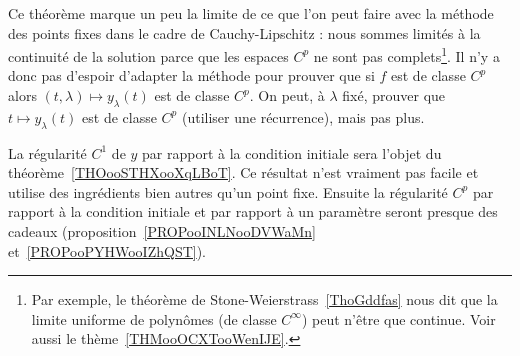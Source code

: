\begin{normaltext}
	Ce théorème marque un peu la limite de ce que l'on peut faire avec la méthode des points fixes dans le cadre de Cauchy-Lipschitz : nous sommes limités à la continuité de la solution parce que les espaces \( C^p\) ne sont pas complets\footnote{Par exemple, le théorème de Stone-Weierstrass~\ref{ThoGddfas} nous dit que la limite uniforme de polynômes (de classe \(  C^{\infty}\)) peut n'être que continue. Voir aussi le thème~\ref{THMooOCXTooWenIJE}.}. Il n'y a donc pas d'espoir d'adapter la méthode pour prouver que si \( f\) est de classe \( C^p\) alors \( (t,\lambda)\mapsto y_{\lambda}(t)\) est de classe \( C^p\). On peut, à \( \lambda\) fixé, prouver que \( t\mapsto y_{\lambda}(t)\) est de classe \( C^p\) (utiliser une récurrence), mais pas plus.

	La régularité \( C^1\) de \( y\) par rapport à la condition initiale sera l'objet du théorème~\ref{THOooSTHXooXqLBoT}. Ce résultat n'est vraiment pas facile et utilise des ingrédients bien autres qu'un point fixe. Ensuite la régularité \( C^p\) par rapport à la condition initiale et par rapport à un paramètre seront presque des cadeaux (proposition~\ref{PROPooINLNooDVWaMn} et~\ref{PROPooPYHWooIZhQST}).
\end{normaltext}

